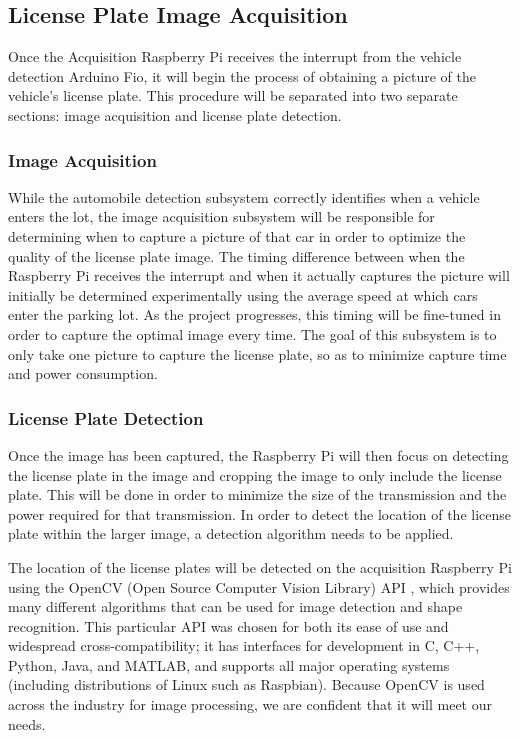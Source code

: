 \documentclass[11pt, oneside, fullpage, doublespace]{article}
\begin{document}
\subsection{License Plate Image Acquisition}
Once the Acquisition Raspberry Pi receives the interrupt from the vehicle detection Arduino Fio, it will begin the process of obtaining a picture of the vehicle's license plate. This procedure will be separated into two separate sections: image acquisition and license plate detection.

\subsubsection{Image Acquisition}
While the automobile detection subsystem correctly identifies when a vehicle enters the lot, the image acquisition subsystem will be responsible for determining when to capture a picture of that car in order to optimize the quality of the license plate image. The timing difference between when the Raspberry Pi receives the interrupt and when it actually captures the picture will initially be determined experimentally using the average speed at which cars enter the parking lot. As the project progresses, this timing will be fine-tuned in order to capture the optimal image every time. The goal of this subsystem is to only take one picture to capture the license plate, so as to minimize capture time and power consumption.

\subsubsection{License Plate Detection}
Once the image has been captured, the Raspberry Pi will then focus on detecting the license plate in the image and cropping the image to only include the license plate. This will be done in order to minimize the size of the transmission and the power required for that transmission. In order to detect the location of the license plate within the larger image, a detection algorithm needs to be applied.

The location of the license plates will be detected on the acquisition Raspberry Pi using the OpenCV (Open Source Computer Vision Library) API \cite{openCV}, which provides many different algorithms that can be used for image detection and shape recognition. This particular API was chosen for both its ease of use and widespread cross-compatibility; it has interfaces for development in C, C++, Python, Java, and MATLAB, and supports all major operating systems (including distributions of Linux such as Raspbian). Because OpenCV is used across the industry for image processing, we are confident that it will meet our needs.
\end{document}
